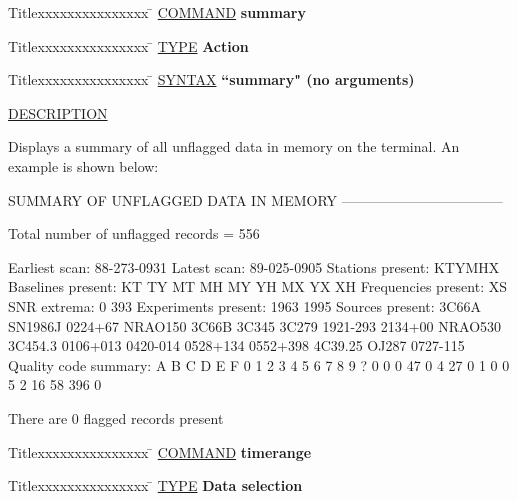 \begin{tabbing}
Titlexxxxxxxxxxxxxxx \= \kill
\underline{COMMAND} \> {\bf 	summary} \\
\end{tabbing}

\begin{tabbing}
Titlexxxxxxxxxxxxxxx \= \kill
\underline{TYPE} \> {\bf 		Action} \\
\end{tabbing}

\begin{tabbing}
Titlexxxxxxxxxxxxxxx \= \kill
\underline{SYNTAX} \> {\bf 		``summary" (no arguments)} \\
\end{tabbing}

\underline{DESCRIPTION}
\begin{list}{}{\setlength{\leftmargin}{0.5in}
     \setlength{\rightmargin}{0in}}
\item
Displays a summary of all unflagged data in memory on
the terminal.  An example is shown below:
\item
		SUMMARY OF UNFLAGGED DATA IN MEMORY
		-----------------------------------
\item
Total number of unflagged records = 556
\item
Earliest scan:       88-273-0931
Latest scan:         89-025-0905
Stations present:    KTYMHX
Baselines present:   KT TY MT MH MY YH MX YX XH 
Frequencies present: XS
SNR extrema:         0    393
Experiments present: 1963 1995
Sources present:     
	3C66A SN1986J 0224+67 NRAO150 3C66B 3C345 3C279 
	1921-293 2134+00 NRAO530 3C454.3 0106+013 0420-014 0528+134 
	0552+398 4C39.25 OJ287 0727-115 
Quality code summary:
	   A   B   C   D   E   F   0   1   2   3   4   5   6   7   8   9   ?
	   0   0   0  47   0   4  27   0   1   0   0   5   2  16  58 396   0
\item
There are 0 flagged records present
\item
\end{list}
\vspace{.2in}

\begin{tabbing}
Titlexxxxxxxxxxxxxxx \= \kill
\underline{COMMAND} \> {\bf 	timerange} \\
\end{tabbing}

\begin{tabbing}
Titlexxxxxxxxxxxxxxx \= \kill
\underline{TYPE} \> {\bf 		Data selection} \\
\end{tabbing}


